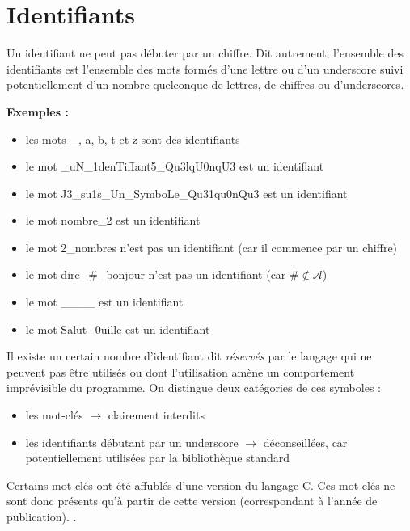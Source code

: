 \documentclass[../../../main.tex]{subfiles}
\begin{document}
\section{Identifiants}\label{sec:identifiants}
 
Un identifiant ne peut pas débuter par un chiffre.
Dit autrement, l'ensemble des identifiants est l'ensemble des mots formés d'une lettre ou d'un underscore suivi potentiellement d'un nombre quelconque de lettres, de chiffres ou d'underscores.
 
\textbf{Exemples :}
\begin{itemize}
	\item les mots \textsf{\_}, \textsf{a}, \textsf{b}, \textsf{t} et \textsf{z} sont des identifiants
	\item le mot \textsf{\_uN\_1denTifIant5\_Qu3lqU0nqU3} est un identifiant
	\item le mot \textsf{J3\_su1s\_Un\_SymboLe\_Qu31qu0nQu3} est un identifiant
	\item le mot \textsf{nombre\_2} est un identifiant
	\item le mot \textsf{2\_nombres} n'est pas un identifiant (car il commence par un chiffre)
	\item le mot \textsf{dire\_\#\_bonjour} n'est pas un identifiant (car $\#\notin{\mathcal{A}}$)
	\item le mot \textsf{\_\_\_\_} est un identifiant
	\item le mot \textsf{Salut\_0uille} est un identifiant
\end{itemize}
Il existe un certain nombre d'identifiant dit \textit{réservés} par le langage qui ne peuvent pas être utilisés ou dont l'utilisation amène un comportement imprévisible du programme. On distingue deux catégories de ces symboles :
\begin{itemize}
	\item les mot-clés $\rightarrow$ clairement interdits
	\item les identifiants débutant par un underscore $\rightarrow$ déconseillées, car potentiellement utilisées par la bibliothèque standard
\end{itemize}
Certains mot-clés ont été affublés d'une version du langage C. Ces mot-clés ne sont donc présents qu'à partir de cette version (correspondant à l'année de publication). .
 
\end{document}
